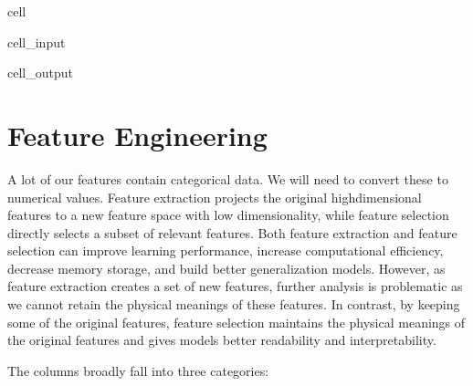 \documentclass[letterpaper,10pt,english]{jupyterBook}
\begin{document}
\begin{sphinxuseclass}{cell}\begin{sphinxVerbatimInput}

\begin{sphinxuseclass}{cell_input}
\begin{sphinxVerbatim}[commandchars=\\\{\}]
   
\end{sphinxVerbatim}

\end{sphinxuseclass}\end{sphinxVerbatimInput}
\begin{sphinxVerbatimOutput}

\begin{sphinxuseclass}{cell_output}
\end{sphinxuseclass}\end{sphinxVerbatimOutput}

\end{sphinxuseclass}

\section{Feature Engineering}
\label{\detokenize{Initial_Data_Exploration:feature-engineering}}
\sphinxAtStartPar
A lot of our features contain categorical data. We will need to convert these to numerical values. Feature extraction projects the original high\sphinxhyphen{}dimensional features to a new feature space with low dimensionality, while feature selection directly selects a subset of relevant features. Both feature extraction
and feature selection can improve learning performance, increase computational efficiency, decrease memory storage, and build better
generalization models. However, as feature extraction creates a set of new features, further analysis is problematic as we cannot retain the
physical meanings of these features. In contrast, by keeping some of the original features, feature selection maintains the physical
meanings of the original features and gives models better readability and interpretability.

\sphinxAtStartPar
The columns broadly fall into three categories:
\end{document}
